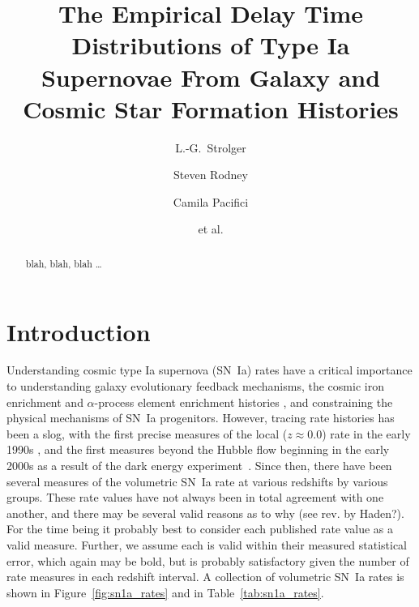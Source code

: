 \documentclass[apj]{aastex62}
\begin{document}
\title{The Empirical Delay Time Distributions of Type Ia Supernovae From Galaxy and Cosmic Star Formation Histories}
\author[0000-0002-7756-4440]{L.-G.~Strolger}
\author{Steven Rodney}
\author{Camila Pacifici}
\author{et al.}

\begin{abstract}
blah, blah, blah \ldots
\end{abstract}

\section{Introduction}
Understanding cosmic type Ia supernova (SN~Ia) rates have a critical importance to understanding galaxy evolutionary feedback mechanisms, the cosmic iron enrichment and $\alpha$-process element enrichment histories \citep{Maoz:2017ck}, and constraining the physical mechanisms of SN~Ia progenitors. However, tracing rate histories has been a slog, with the first precise measures of the local ($z\approx0.0$) rate in the early 1990s \cite[cf.][]{Cappellaro:1993qm,Cappellaro:1997,Cappellaro:1999}, and the first measures beyond the Hubble flow beginning in the early 2000s as a result of the dark energy experiment~\citep{Riess:1998,Perlmutter:1999}. Since then, there have been several measures of the volumetric SN~Ia rate at various redshifts by various groups. These rate values have not always been in total agreement with one another, and there may be several valid reasons as to why (see rev. by Haden?). For the time being it probably best to consider each published rate value as a valid measure. Further, we assume each is valid within their measured statistical error, which again may be bold, but is probably satisfactory given the number of rate measures in each redshift interval. A collection of volumetric SN~Ia rates is shown in Figure~\ref{fig:sn1a_rates} and in Table~\ref{tab:sn1a_rates}. 
\end{document}
